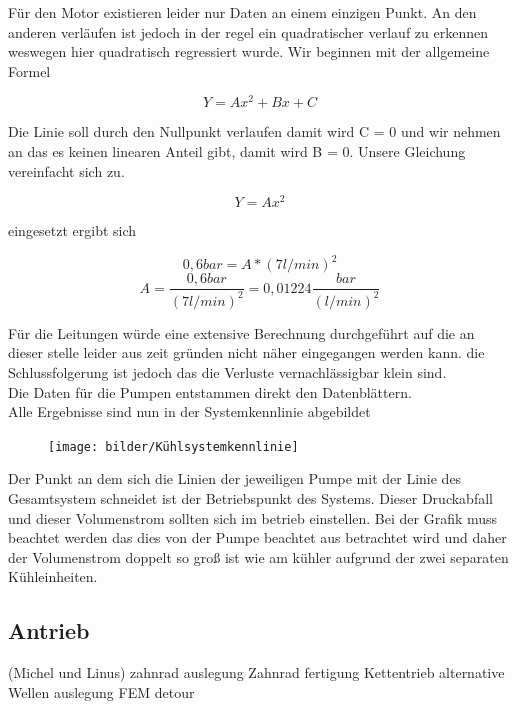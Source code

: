 Für den Motor existieren leider nur Daten an einem einzigen Punkt. An den anderen verläufen ist jedoch in der regel ein quadratischer verlauf zu erkennen weswegen hier quadratisch regressiert wurde. Wir beginnen mit der allgemeine Formel

\begin{equation}
	Y = A x^2 + B x + C
\end{equation}

Die Linie soll durch den Nullpunkt verlaufen damit wird C = 0 und wir nehmen an das es keinen linearen Anteil gibt, damit wird B = 0. Unsere Gleichung vereinfacht sich zu.

\begin{equation}
	Y = A x^2
\end{equation}

eingesetzt ergibt sich

\begin{equation}
	0,6 bar = A * (7 l/min)^2  
\end{equation}
\begin{equation}
	A = \dfrac{0,6 bar}{(7 l/min)^2 }
	  = 0,01224 \dfrac{bar}{(l/min)^2}
\end{equation}

Für die Leitungen würde eine extensive Berechnung durchgeführt auf die an dieser stelle leider aus zeit gründen nicht näher eingegangen werden kann. die Schlussfolgerung ist jedoch das die Verluste vernachlässigbar klein sind. \\

Die Daten für die Pumpen entstammen direkt den Datenblättern.\\

Alle Ergebnisse sind nun in der Systemkennlinie abgebildet

\begin{figure}[h]
	\centering
	\texttt{[image: bilder/Kühlsystemkennlinie]}
	\caption{}
	\label{fig:kuhlsystemkennlinie}
\end{figure}

Der Punkt an dem sich die Linien der jeweiligen Pumpe mit der Linie des Gesamtsystem schneidet ist der Betriebspunkt des Systems. Dieser Druckabfall und dieser Volumenstrom sollten sich im betrieb einstellen. Bei der Grafik muss beachtet werden das dies von der Pumpe beachtet aus betrachtet wird und daher der Volumenstrom doppelt so groß ist wie am kühler aufgrund der zwei separaten Kühleinheiten.


\subsection{Antrieb} (Michel und Linus)
zahnrad auslegung
Zahnrad fertigung
Kettentrieb alternative
Wellen auslegung
FEM detour

